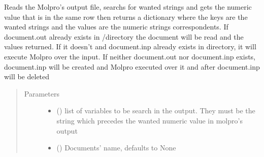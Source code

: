 \documentclass[letterpaper,10pt,english]{sphinxmanual}
\begin{document}
\begin{fulllineitems}

\begin{fulllineitems}
\label{\detokenize{MolOpt.molecular:MolOpt.molecular.molecular.Molecule.get_value}}
\sphinxAtStartPar
Reads the Molpro’s output file, searchs for wanted strings and gets the numeric value that is in the same row
then returns a dictionary where the keys are the wanted strings and the values are the numeric strings 
correspondents. If document.out already exists in /directory the document will be read and the values returned. 
If it doesn’t and document.inp already exists in directory, it will execute Molpro over the input. If neither 
document.out nor document.inp exists, document.inp will be created and Molpro executed over it and after 
document.inp will be deleted
\begin{quote}\begin{description}
\item[{Parameters}] \leavevmode\begin{itemize}
\item {} 
\sphinxAtStartPar
{} (\sphinxstyleliteralemphasis{\sphinxupquote{{[}}}\sphinxstyleliteralemphasis{\sphinxupquote{{]}}}) \textendash{} list of variables to be search in the output. They must be the string which precedes the wanted
numeric value in molpro’s output

\item {} 
\sphinxAtStartPar
{} (\sphinxstyleliteralemphasis{\sphinxupquote{, }}) \textendash{} Documents’ name, defaults to None


\end{itemize}
\end{description}
\end{quote}
\end{fulllineitems}
\end{fulllineitems}
\end{document}
